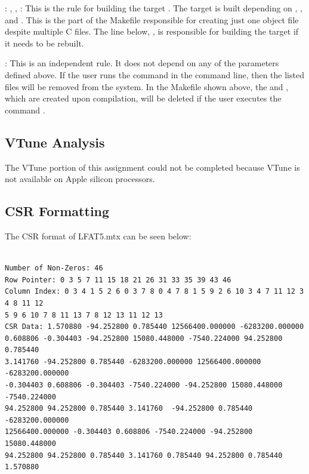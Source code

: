 \documentclass[12pt]{article}
\begin{document}
: , , : This is the rule for building the target . The target is built depending on , , and . This is the part of the Makefile responsible for creating just one object file despite multiple C files. The line below, , is responsible for building the target if it needs to be rebuilt.

: This is an independent rule. It does not depend on any of the parameters defined above. If the user runs the command  in the command line, then the listed files will be removed from the system. In the Makefile shown above, the  and , which are created upon compilation, will be deleted if the user executes the command .

\subsection{VTune Analysis}

The VTune portion of this assignment could not be completed because VTune is not available on Apple silicon processors.

\subsection{CSR Formatting}

The CSR format of LFAT5.mtx can be seen below:

 	\begin{mdframed}[style=myboxstyleTerminal1]
		\begin{verbatim}

Number of Non-Zeros: 46
Row Pointer: 0 3 5 7 11 15 18 21 26 31 33 35 39 43 46 
Column Index: 0 3 4 1 5 2 6 0 3 7 8 0 4 7 8 1 5 9 2 6 10 3 4 7 11 12 3 4 8 11 12
5 9 6 10 7 8 11 13 7 8 12 13 11 12 13 
CSR Data: 1.570880 -94.252800 0.785440 12566400.000000 -6283200.000000 
0.608806 -0.304403 -94.252800 15080.448000 -7540.224000 94.252800 0.785440
3.141760 -94.252800 0.785440 -6283200.000000 12566400.000000 -6283200.000000 
-0.304403 0.608806 -0.304403 -7540.224000 -94.252800 15080.448000 -7540.224000
94.252800 94.252800 0.785440 3.141760  -94.252800 0.785440 -6283200.000000
12566400.000000 -0.304403 0.608806 -7540.224000 -94.252800 15080.448000 
94.252800 94.252800 0.785440 3.141760 0.785440 94.252800 0.785440 1.570880

		\end{verbatim}
	\end{mdframed}
\end{document}
